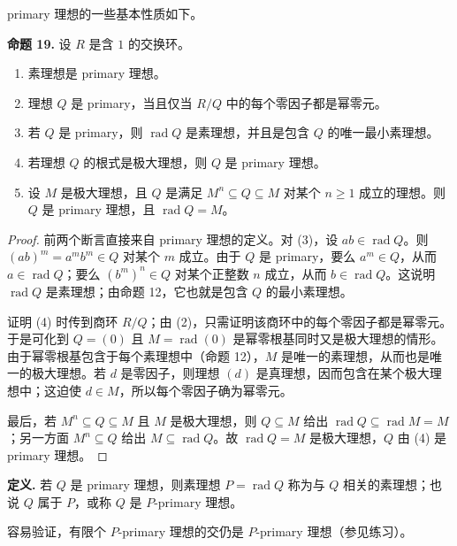 primary 理想的一些基本性质如下。

\noindent\textbf{命题 19.} 设 $R$ 是含 $1$ 的交换环。
\begin{enumerate}[label=(\arabic*)]
	\item 素理想是 primary 理想。
	\item 理想 $Q$ 是 primary，当且仅当 $R/Q$ 中的每个零因子都是幂零元。
	\item 若 $Q$ 是 primary，则 $\operatorname{rad}Q$ 是素理想，并且是包含 $Q$ 的唯一最小素理想。
	\item 若理想 $Q$ 的根式是极大理想，则 $Q$ 是 primary 理想。
	\item 设 $M$ 是极大理想，且 $Q$ 是满足 $M^n\subseteq Q\subseteq M$ 对某个 $n\geq1$ 成立的理想。则 $Q$ 是 primary 理想，且 $\operatorname{rad}Q=M$。
\end{enumerate}

\begin{proof}
	前两个断言直接来自 primary 理想的定义。对 (3)，设 $ab\in\operatorname{rad}Q$。则 $(ab)^m=a^mb^m\in Q$ 对某个 $m$ 成立。由于 $Q$ 是 primary，要么 $a^m\in Q$，从而 $a\in\operatorname{rad}Q$；要么 $(b^m)^n\in Q$ 对某个正整数 $n$ 成立，从而 $b\in\operatorname{rad}Q$。这说明 $\operatorname{rad}Q$ 是素理想；由命题 12，它也就是包含 $Q$ 的最小素理想。
	
	证明 (4) 时传到商环 $R/Q$；由 (2)，只需证明该商环中的每个零因子都是幂零元。于是可化到 $Q=(0)$ 且 $M=\operatorname{rad}(0)$ 是幂零根基同时又是极大理想的情形。由于幂零根基包含于每个素理想中（命题 12），$M$ 是唯一的素理想，从而也是唯一的极大理想。若 $d$ 是零因子，则理想 $(d)$ 是真理想，因而包含在某个极大理想中；这迫使 $d\in M$，所以每个零因子确为幂零元。
	
	最后，若 $M^n\subseteq Q\subseteq M$ 且 $M$ 是极大理想，则 $Q\subseteq M$ 给出 $\operatorname{rad}Q\subseteq\operatorname{rad}M=M$；另一方面 $M^n\subseteq Q$ 给出 $M\subseteq\operatorname{rad}Q$。故 $\operatorname{rad}Q=M$ 是极大理想，$Q$ 由 (4) 是 primary 理想。
\end{proof}

\noindent\textbf{定义.} 若 $Q$ 是 primary 理想，则素理想 $P=\operatorname{rad}Q$ 称为与 $Q$ 相关的素理想；也说 $Q$ 属于 $P$，或称 $Q$ 是 $P$-primary 理想。

容易验证，有限个 $P$-primary 理想的交仍是 $P$-primary 理想（参见练习）。

